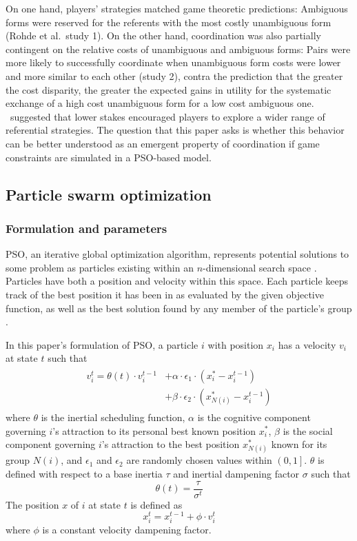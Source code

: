 \documentclass[a4paper,11pt]{article}
\begin{document}
On one hand, players' strategies matched game theoretic predictions: Ambiguous forms were reserved for the referents with the most costly unambiguous form (Rohde et al.\ study 1).  On the other hand, coordination was also partially contingent on the relative costs of unambiguous and ambiguous forms: Pairs were more likely to successfully coordinate when unambiguous form costs were lower and more similar to each other (study 2), contra the prediction that the greater the cost disparity, the greater the expected gains in utility for the systematic exchange of a high cost unambiguous form for a low cost ambiguous one. \citeauthor{rohde2012}\ suggested that lower stakes encouraged players to explore a wider range of referential strategies. The question that this paper asks is whether this behavior can be better understood as an emergent property of coordination if game constraints are simulated in a PSO-based model.


\subsection{Particle swarm optimization}
\subsubsection{Formulation and parameters}
\label{sec:2.2.3}
PSO, an iterative global optimization algorithm, represents potential solutions to some problem as particles existing within an $n$-dimensional search space \cite{kennedy1995}. Particles have both a position and velocity within this space. Each particle keeps track of the best position it has been in as evaluated by the given objective function, as well as the best solution found by any member of the particle's group \cite{chong2013}. 

In this paper's formulation of PSO, a particle $i$ with position $x_i$ has a velocity $v_i$ at state $t$ such that 
\begin{multline} \label{eq:pso_vel}
\begin{split}
v_i^t = \theta(t) \cdot v_i^{t-1} & + \alpha \cdot \epsilon_1 \cdot (x_i^* - x_i^{t-1}) \\
                                  & + \beta \cdot \epsilon_2 \cdot (x_{N(i)}^* - x_i^{t-1})
\end{split}
\end{multline}
where $\theta$ is the inertial scheduling function, $\alpha$ is the cognitive component governing $i$'s attraction to its personal best known position $x_i^*$, $\beta$ is the social component governing $i$'s attraction to the best position $x_{N(i)}^*$ known for its group $N(i)$, and $\epsilon_1$ and $\epsilon_2$ are randomly chosen values within $\left(0, 1\right]$. $\theta$ is defined with respect to a base inertia $\tau$ and inertial dampening factor $\sigma$ such that
\begin{equation}
\theta(t) = \frac{\tau}{\sigma^t} 
\end{equation}
The position $x$ of $i$ at state $t$ is defined as
\begin{equation}
x_i^t = x_i^{t-1} + \phi \cdot v_i^t 
\end{equation}
where $\phi$ is a constant velocity dampening factor.
\end{document}
